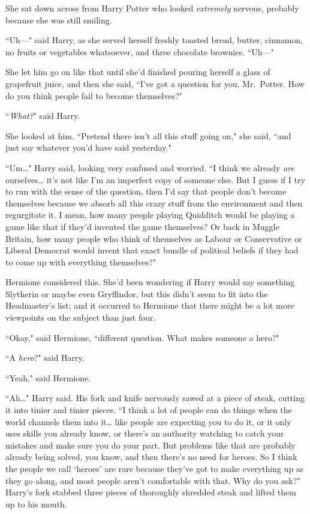 She sat down across from Harry Potter who looked \emph{extremely} nervous, probably because she was still smiling.

``Uh---" said Harry, as she served herself freshly toasted bread, butter, cinnamon, no fruits or vegetables whatsoever, and three chocolate brownies. ``Uh---"

She let him go on like that until she'd finished pouring herself a glass of grapefruit juice, and then she said, ``I've got a question for you, Mr.~Potter. How do you think people fail to become themselves?"

``\emph{What?}" said Harry.

She looked at him. ``Pretend there isn't all this stuff going on," she said, ``and just say whatever you'd have said yesterday."

``Um{\ldots}" Harry said, looking very confused and worried. ``I think we already \emph{are} ourselves{\ldots} it's not like I'm an imperfect copy of someone else. But I guess if I try to run with the sense of the question, then I'd say that people don't become themselves because we absorb all this crazy stuff from the environment and then regurgitate it. I mean, how many people playing Quidditch would be playing a game like that if they'd invented the game themselves? Or back in Muggle Britain, how many people who think of themselves as Labour or Conservative or Liberal Democrat would invent that exact bundle of political beliefs if they had to come up with everything themselves?"

Hermione considered this. She'd been wondering if Harry would say something Slytherin or maybe even Gryffindor, but this didn't seem to fit into the Headmaster's list; and it occurred to Hermione that there might be a lot more viewpoints on the subject than just four.

``Okay," said Hermione, ``different question. What makes someone a hero?"

``A \emph{hero}?" said Harry.

``Yeah," said Hermione.

``Ah{\ldots}" Harry said. His fork and knife nervously sawed at a piece of steak, cutting it into tinier and tinier pieces. ``I think a lot of people can do things when the world channels them into it{\ldots} like people are expecting you to do it, or it only uses skills you already know, or there's an authority watching to catch your mistakes and make sure you do your part. But problems like that are probably already being solved, you know, and then there's no need for heroes. So I think the people we call `heroes' are rare because they've got to make everything up as they go along, and most people aren't comfortable with that. Why do you ask?" Harry's fork stabbed three pieces of thoroughly shredded steak and lifted them up to his mouth.

